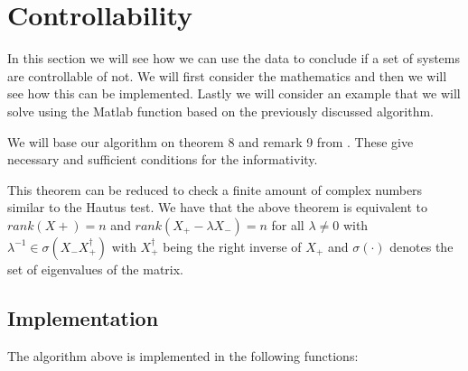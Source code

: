 \section{Controllability}
In this section we will see how we can use the data to conclude if a set of systems are controllable of not. We will first consider the mathematics and then we will see how this can be implemented. Lastly we will consider an example that we will solve using the Matlab function based on the previously discussed algorithm.


We will base our algorithm on theorem 8 and remark 9 from \cite{waarde2019data}. These give necessary and sufficient conditions for the informativity.


This theorem can be reduced to check a finite amount of complex numbers similar to the Hautus test. We have that the above theorem is equivalent to $rank(X+) = n$ and $rank(X_+ - \lambda X_-) = n$ for all $\lambda \neq 0$ with $\lambda^{-1} \in \sigma(X_- X_+^\dagger)$ with $X_+^\dagger$ being the right inverse of $X_+$ and $\sigma(\cdot)$ denotes the set of eigenvalues of the matrix.



\subsection{Implementation}
The algorithm above is implemented in the following functions:
